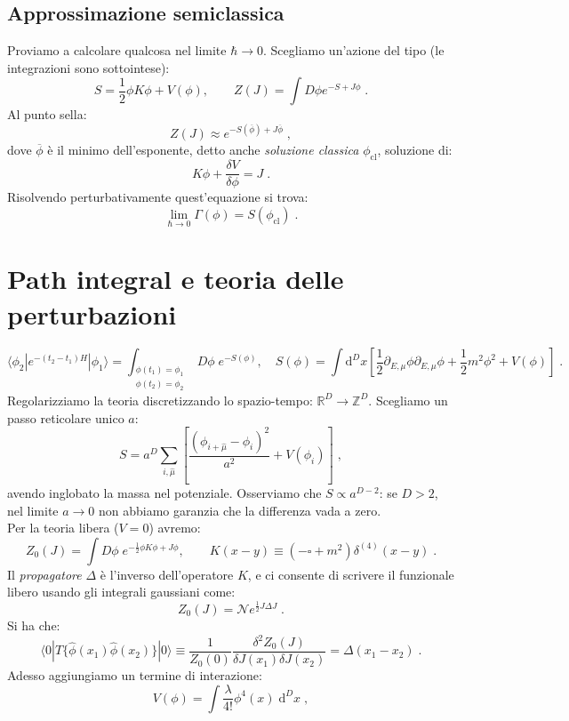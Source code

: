 \documentclass[12pt,a4paper]{article}
\theoremstyle{definition}
\numberwithin{equation}{section}
\newcommand{\diff}[1][]{\mathrm{d}#1}
\newcommand{\bra}{\langle}
\newcommand{\ket}{\rangle}
\begin{document}
\subsection{Approssimazione semiclassica}
Proviamo a calcolare qualcosa nel limite $\hbar\to 0$. Scegliamo un'azione del tipo (le integrazioni sono sottointese):
$$
S=\frac{1}{2}\phi K\phi+V(\phi),\qquad Z(J)=\int D\phi e^{-S+ J\phi}\;.
$$
Al punto sella:
$$
Z(J)\approx e^{-S(\overline{\phi})+J\overline{\phi}}\;,
$$
dove $\overline{\phi}$ è il minimo dell'esponente, detto anche \emph{soluzione classica} $\phi_{\mathrm{cl}}$, soluzione di:
$$
K\phi+\frac{\delta V}{\delta \phi}=J\;.
$$
Risolvendo perturbativamente quest'equazione si trova:
$$
\lim_{\hbar\to 0}\Gamma(\phi)=S(\phi_{\mathrm{cl}})\;.
$$
\section{Path integral e teoria delle perturbazioni}
$$
\bra \phi_2|e^{-(t_2-t_1)H}|\phi_1\ket=\int_{\substack{\phi(t_1)=\phi_1 \\ \phi(t_2)=\phi_2}} D\phi\; e^{-S(\phi)}, \quad S(\phi)=\int\diff^D{x}\left[\frac{1}{2}\partial_{E,\mu}\phi\partial_{E,\mu}\phi+\frac{1}{2}m^2\phi^2+V(\phi)\right]\;.
$$
Regolarizziamo la teoria discretizzando lo spazio-tempo: $\mathbb{R}^D\to\mathbb{Z}^D$. Scegliamo un passo reticolare unico $a$:
$$
S=a^D\sum_{i,\hat{\mu}}\left[\frac{(\phi_{i+\hat{\mu}}-\phi_i)^2}{a^2}+V(\phi_i)\right]\;,
$$
avendo inglobato la massa nel potenziale. Osserviamo che $S\propto a^{D-2}$: se $D>2$, nel limite $a\to 0$ non abbiamo garanzia che la differenza vada a zero. \\
Per la teoria libera ($V=0$) avremo:
\begin{equation}
Z_0(J)=\int D\phi\; e^{-\frac{1}{2}\phi K\phi+J\phi},\qquad K(x-y)\equiv (-\square+m^2)\delta^{(4)}(x-y)\;.
\end{equation}
Il \emph{propagatore} $\Delta$ è l'inverso dell'operatore $K$, e ci consente di scrivere il funzionale libero usando gli integrali gaussiani come:
\begin{equation}
Z_0(J)=\mathcal{N}e^{\frac{1}{2}J\Delta J}\;.
\end{equation}
Si ha che:
\begin{equation}
\bra 0|T\{\hat{\phi}(x_1)\hat{\phi}(x_2)\}|0\ket\equiv \frac{1}{Z_0(0)}\frac{\delta^2 Z_0(J)}{\delta J(x_1)\delta J(x_2)}=\Delta(x_1-x_2)\;.
\end{equation}
Adesso aggiungiamo un termine di interazione:
\begin{equation}
V(\phi)=\int\frac{\lambda}{4!}\phi^4(x)\;\diff^D{x}\;,
\end{equation}
\end{document}
